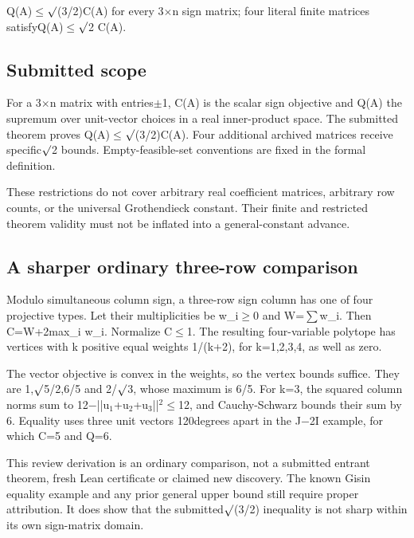 \documentclass[11pt,a4paper]{article}
\begin{document}
Q(A)\ensuremath{\leq}\ensuremath{\surd}(3/2)C(A) for every 3\ensuremath{\times}n sign matrix; four literal finite matrices satisfyQ(A)\ensuremath{\leq}\ensuremath{\surd}2 C(A).

\subsection{Submitted scope}
For a 3\ensuremath{\times}n matrix with entries\ensuremath{\pm}1, C(A) is the scalar sign objective and Q(A) the supremum over unit-vector choices in a real inner-product space. The submitted theorem proves Q(A)\ensuremath{\leq}\ensuremath{\surd}(3/2)C(A). Four additional archived matrices receive specific\ensuremath{\surd}2 bounds. Empty-feasible-set conventions are fixed in the formal definition.

These restrictions do not cover arbitrary real coefficient matrices, arbitrary row counts, or the universal Grothendieck constant. Their finite and restricted theorem validity must not be inflated into a general-constant advance.

\subsection{A sharper ordinary three-row comparison}
Modulo simultaneous column sign, a three-row sign column has one of four projective types. Let their multiplicities be w\_i\ensuremath{\geq}0 and W=\ensuremath{\sum}w\_i. Then C=W+2max\_i w\_i. Normalize C\ensuremath{\leq}1. The resulting four-variable polytope has vertices with k positive equal weights 1/(k+2), for k=1,2,3,4, as well as zero.

The vector objective is convex in the weights, so the vertex bounds suffice. They are 1,\ensuremath{\surd}5/2,6/5 and 2/\ensuremath{\surd}3, whose maximum is 6/5. For k=3, the squared column norms sum to 12\ensuremath{-}||u\ensuremath{_1}+u\ensuremath{_2}+u\ensuremath{_3}||\ensuremath{^2}\ensuremath{\leq}12, and Cauchy-Schwarz bounds their sum by 6. Equality uses three unit vectors 120degrees apart in the J\ensuremath{-}2I example, for which C=5 and Q=6.

This review derivation is an ordinary comparison, not a submitted entrant theorem, fresh Lean certificate or claimed new discovery. The known Gisin equality example and any prior general upper bound still require proper attribution. It does show that the submitted\ensuremath{\surd}(3/2) inequality is not sharp within its own sign-matrix domain.
\end{document}
